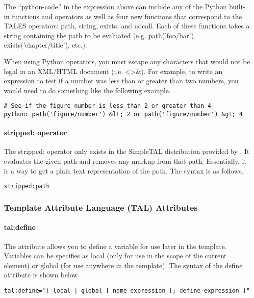 The ``python-code'' in the expression above can include any of the Python
built-in functions and operators as well as four new functions that
correspond to the TALES operators: path, string, exists, and nocall.
Each of these functions takes a string containing the path to be
evaluated (e.g. path('foo/bar'), exists('chapter/title'), etc.).

When using Python operators, you must escape any characters that would
not be legal in an XML/HTML document (i.e. <>\&).  For example,
to write an expression to test if a number was less than or greater than
two numbers, you would need to do something like the following example.
\begin{verbatim}
# See if the figure number is less than 2 or greater than 4
python: path('figure/number') &lt; 2 or path('figure/number') &gt; 4
\end{verbatim}


\paragraph{stripped: operator}

The stripped: operator only exists in the SimpleTAL distribution provided
by \plasTeX.  It evaluates the given path and removes any markup from
that path.  Essentially, it is a way to get a plain text representation
of the path.  The syntax is as follows.
\begin{verbatim}
stripped:path
\end{verbatim}


\subsubsection{Template Attribute Language (TAL) Attributes\label{sec:talattributes}}

\paragraph{tal:define}

The  attribute allows you to define a variable for use
later in the template.  Variables can be specifies as local (only for
use in the scope of the current element) or global (for use anywhere in
the template).  The syntax of the define attribute is shown below.
\begin{verbatim}
tal:define="[ local | global ] name expression [; define-expression ]"
\end{verbatim}

